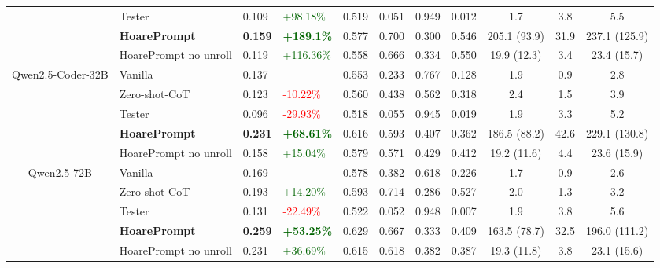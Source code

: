 \documentclass[sigconf]{acmart}
\begin{document}
\begin{table}[t]
\begin{tabular}{|c|l|p{0.9cm}p{1.2cm}p{0.9cm}p{0.9cm}p{0.9cm}p{0.9cm}|ccc|}
        & Tester             & 0.109 & \textcolor{darkgreen}{+98.18\%} & 0.519 & 0.051 & 0.949 & 0.012 & 1.7 & 3.8 & 5.5 \\
        \cline{2-11}
        & \textbf{HoarePrompt}         & \textbf{0.159} & \textcolor{darkgreen}{\textbf{+189.1\%}} & 0.577 & 0.700 & 0.300 & 0.546 & 205.1 (93.9) & 31.9 & 237.1 (125.9) \\
        & HoarePrompt no unroll & 0.119 & \textcolor{darkgreen}{+116.36\%} & 0.558 & 0.666 & 0.334 & 0.550 & 19.9 (12.3) & 3.4 & 23.4 (15.7) \\
        \hline
        \hline
        \multirow{5}{*}{\parbox{1.8cm}{\centering Qwen2.5-Coder-32B}}
        & Vanilla       & 0.137 & \textcolor{red}{ } & 0.553 & 0.233 & 0.767 & 0.128 & 1.9 & 0.9 & 2.8 \\
        & Zero-shot-CoT  & 0.123  & \textcolor{red}{-10.22\%} & 0.560 & 0.438 & 0.562 & 0.318 & 2.4 & 1.5 & 3.9 \\
        & Tester  & 0.096 &\textcolor{red}{-29.93\%}  & 0.518 & 0.055 & 0.945 & 0.019 & 1.9 & 3.3 & 5.2 \\
        \cline{2-11}
        & \textbf{HoarePrompt}         & \textbf{0.231} & \textcolor{darkgreen}{\textbf{+68.61\%}}  &0.616 & 0.593 & 0.407 & 0.362 & 186.5 (88.2) & 42.6 & 229.1 (130.8) \\
        & HoarePrompt no unroll & 0.158 &\textcolor{darkgreen}{+15.04\%}  & 0.579 & 0.571 & 0.429 & 0.412 & 19.2 (11.6) & 4.4 & 23.6 (15.9) \\
        \hline
        \hline
        \multirow{5}{*}{\parbox{1.8cm}{\centering Qwen2.5-72B}} 
        & Vanilla       & 0.169  & \textcolor{red}{ }  & 0.578 & 0.382 & 0.618 & 0.226 & 1.7 & 0.9 & 2.6 \\
        & Zero-shot-CoT  & 0.193 & \textcolor{darkgreen}{+14.20\%}  & 0.593 & 0.714 & 0.286 & 0.527 & 2.0 & 1.3 & 3.2 \\
        & Tester             & 0.131  &\textcolor{red}{-22.49\%}  & 0.522 & 0.052 & 0.948 & 0.007 & 1.9 & 3.8 & 5.6 \\
        \cline{2-11}
        & \textbf{HoarePrompt}         & \textbf{0.259} &  \textcolor{darkgreen}{\textbf{+53.25\%}} & 0.629 & 0.667 & 0.333 & 0.409 & 163.5 (78.7) & 32.5 & 196.0 (111.2) \\
        & HoarePrompt no unroll & 0.231 & \textcolor{darkgreen}{+36.69\%}  & 0.615 & 0.618 & 0.382 & 0.387 & 19.3 (11.8)  & 3.8 &  23.1 (15.6) \\
        

\end{tabular}
\end{table}
\end{document}
